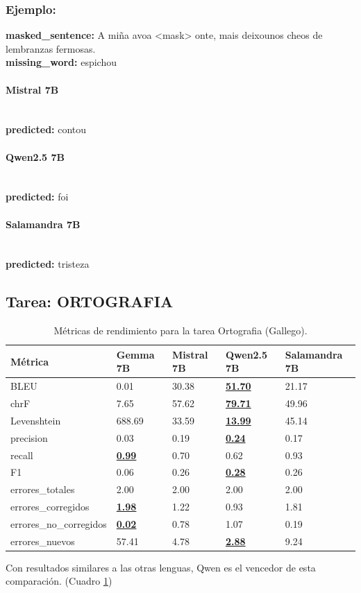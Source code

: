 \subsubsection{Ejemplo:}
\textbf{masked\_sentence:} A miña avoa {\textless}mask{\textgreater} onte, mais deixounos cheos de lembranzas fermosas.\\
\textbf{missing\_word:} espichou

\paragraph{Mistral 7B}~\\
\textbf{predicted:} contou

\paragraph{Qwen2.5 7B}~\\
\textbf{predicted:} foi

\paragraph{Salamandra 7B}~\\
\textbf{predicted:} tristeza

\subsection{Tarea: ORTOGRAFIA}\label{tarea-ortografia}
\begin{longtable}[]{@{}lllll@{}}
\toprule\noalign{}
Métrica & Gemma 7B & Mistral 7B & Qwen2.5 7B & Salamandra 7B \\
\midrule\noalign{}
\endhead
\bottomrule\noalign{}
\caption{Métricas de rendimiento para la tarea Ortografia (Gallego).}
\label{tab:metricas_ortografia_Gallego}
\endlastfoot
BLEU & 0.01 & 30.38 & \textbf{\underline{51.70}} & 21.17 \\
chrF & 7.65 & 57.62 & \textbf{\underline{79.71}} & 49.96 \\
Levenshtein & 688.69 & 33.59 & \textbf{\underline{13.99}} & 45.14 \\
precision & 0.03 & 0.19 & \textbf{\underline{0.24}} & 0.17 \\
recall & \textbf{\underline{0.99}} & 0.70 & 0.62 & 0.93 \\
F1 & 0.06 & 0.26 & \textbf{\underline{0.28}} & 0.26 \\
errores\_totales & 2.00 & 2.00 & 2.00 & 2.00 \\
errores\_corregidos & \textbf{\underline{1.98}} & 1.22 & 0.93 & 1.81 \\
errores\_no\_corregidos & \textbf{\underline{0.02}} & 0.78 & 1.07 & 0.19 \\
errores\_nuevos & 57.41 & 4.78 & \textbf{\underline{2.88}} & 9.24 \\
\end{longtable}
Con resultados similares a las otras lenguas, Qwen es el vencedor de esta comparación. (Cuadro \ref{tab:metricas_ortografia_Gallego})

